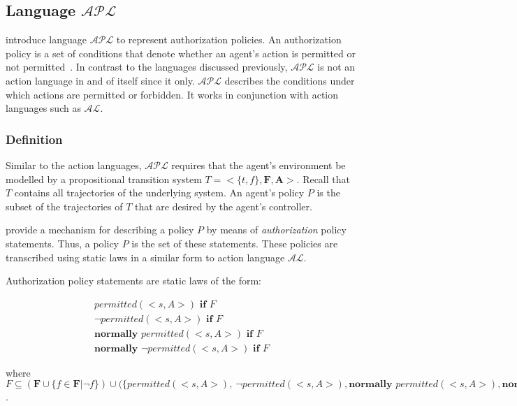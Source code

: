\subsection{Language $\mathcal{APL}$}

\citet{gelfond_authorization_2008} introduce language $\mathcal{APL}$ to represent authorization policies.
An authorization policy is a set of conditions that denote whether an agent's action is permitted or not permitted~\citep{gelfond_authorization_2008}.
In contrast to the languages discussed previously, $\mathcal{APL}$ is not an action language in and of itself since it only.
$\mathcal{APL}$ describes the conditions under which actions are permitted or forbidden.
It works in conjunction with action languages such as $\mathcal{AL}$.

\subsubsection{Definition}

Similar to the action languages, $\mathcal{APL}$ requires that the agent's environment be modelled by a propositional transition system $T=<\{t,f\},\boldsymbol{F},\boldsymbol{A}>$.
Recall that $T$ contains all trajectories of the underlying system.
An agent's policy $P$ is the subset of the trajectories of $T$ that are desired by the agent's controller.

\citet{gelfond_authorization_2008} provide a mechanism for describing a policy $P$ by means of \textit{authorization} policy statements.
Thus, a policy $P$ is the set of these statements.
These policies are transcribed using static laws in a similar form to action language $\mathcal{AL}$.

\begin{definition}
    Authorization policy statements are static laws of the form:

    \begin{gather*}
        permitted\left(<s,A>\right) \textbf{ if } F \\
        \neg permitted\left(<s,A>\right) \textbf{ if } F \\
        \textbf{normally } permitted(<s,A>) \textbf{ if } F \\
        \textbf{normally } \neg permitted(<s,A>) \textbf{ if } F
    \end{gather*}

    \noindent
    where $F\subseteq\left(\boldsymbol{F}\cup\{f\in \boldsymbol{F}|\neg f\}\right) \cup (\{permitted(<s,A>),\ \neg permitted(<s, A>), \textbf{normally } permitted(<s,A>), \textbf{normally } \neg permitted(<s,A>)\}$.
\end{definition}

